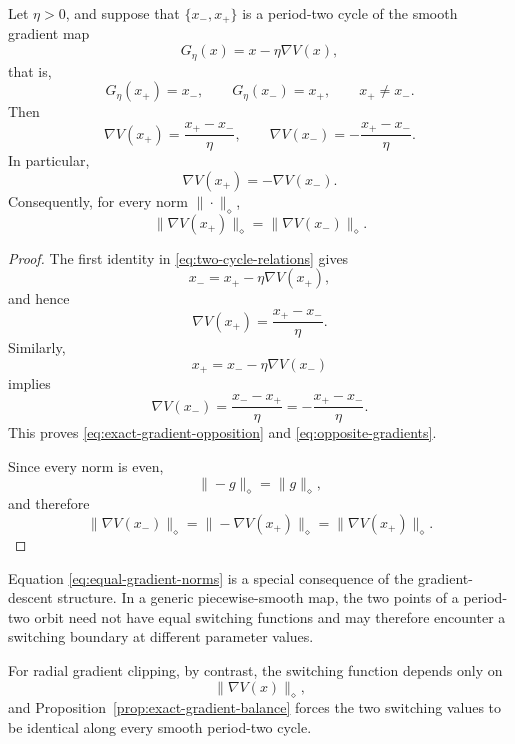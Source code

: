 \begin{proposition}
\label{prop:exact-gradient-balance}
Let $\eta>0$, and suppose that
$\{x_-,x_+\}$ is a period-two cycle of the smooth gradient map
\[
G_\eta(x)
=
x-\eta\nabla V(x),
\]
that is,
\begin{equation}
G_\eta(x_+)=x_-,
\qquad
G_\eta(x_-)=x_+,
\qquad
x_+\neq x_-.
\label{eq:two-cycle-relations}
\end{equation}
Then
\begin{equation}
\nabla V(x_+)
=
\frac{x_+-x_-}{\eta},
\qquad
\nabla V(x_-)
=
-\frac{x_+-x_-}{\eta}.
\label{eq:exact-gradient-opposition}
\end{equation}
In particular,
\begin{equation}
\nabla V(x_+)
=
-\nabla V(x_-).
\label{eq:opposite-gradients}
\end{equation}
Consequently, for every norm $\|\cdot\|_\diamond$,
\begin{equation}
\|\nabla V(x_+)\|_\diamond
=
\|\nabla V(x_-)\|_\diamond.
\label{eq:equal-gradient-norms}
\end{equation}
\end{proposition}

\begin{proof}
The first identity in \eqref{eq:two-cycle-relations} gives
\[
x_-
=
x_+
-
\eta\nabla V(x_+),
\]
and hence
\[
\nabla V(x_+)
=
\frac{x_+-x_-}{\eta}.
\]
Similarly,
\[
x_+
=
x_-
-
\eta\nabla V(x_-)
\]
implies
\[
\nabla V(x_-)
=
\frac{x_--x_+}{\eta}
=
-\frac{x_+-x_-}{\eta}.
\]
This proves \eqref{eq:exact-gradient-opposition} and
\eqref{eq:opposite-gradients}.

Since every norm is even,
\[
\|-g\|_\diamond=\|g\|_\diamond,
\]
and therefore
\[
\|\nabla V(x_-)\|_\diamond
=
\|-\nabla V(x_+)\|_\diamond
=
\|\nabla V(x_+)\|_\diamond.
\]
\end{proof}

\begin{remark}
\label{rem:gradient-special-structure}
Equation \eqref{eq:equal-gradient-norms} is a special consequence of
the gradient-descent structure.  In a generic piecewise-smooth map,
the two points of a period-two orbit need not have equal switching
functions and may therefore encounter a switching boundary at
different parameter values.

For radial gradient clipping, by contrast, the switching function
depends only on
\[
\|\nabla V(x)\|_\diamond,
\]
and Proposition~\ref{prop:exact-gradient-balance} forces the two
switching values to be identical along every smooth period-two
cycle.
\end{remark}

